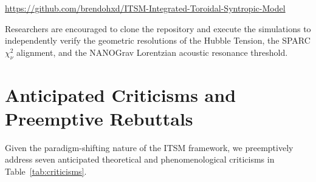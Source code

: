 \documentclass[aps,prd,10pt,twocolumn,superscriptaddress,nofootinbib,floatfix]{revtex4-2}
\begin{document}
\begin{center}
\url{https://github.com/brendohxd/ITSM-Integrated-Toroidal-Syntropic-Model}
\end{center}

Researchers are encouraged to clone the repository and execute the simulations to independently verify the geometric resolutions of the Hubble Tension, the SPARC $\chi^2_\nu$ alignment, and the NANOGrav Lorentzian acoustic resonance threshold.

\section*{Anticipated Criticisms and Preemptive Rebuttals}

Given the paradigm-shifting nature of the ITSM framework, we preemptively address seven anticipated theoretical and phenomenological criticisms in Table~\ref{tab:criticisms}.
\end{document}
